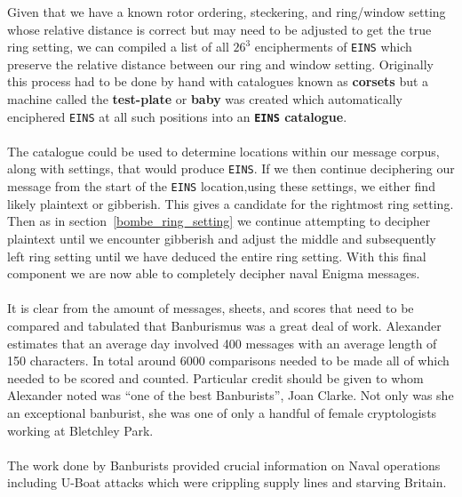   \noindent Given that we have a known rotor ordering, steckering,
  and ring/window setting whose relative distance is correct but may
  need to be adjusted to get the true ring setting, we can compiled a
  list of all $26^3$ encipherments of \texttt{EINS} which preserve
  the relative distance between our ring and window setting.
  Originally this process had to be done by hand with catalogues
  known as {\bf{corsets}} but a machine called the {\bf{test-plate}}
  or {\bf{baby}} was created which automatically enciphered
  \texttt{EINS} at all such positions into an {\bf{\texttt{EINS} catalogue}}.
  \\\\The catalogue could be used to determine locations within our
  message corpus, along with settings, that would produce
  \texttt{EINS}. If we then continue deciphering our message from the
  start of the \texttt{EINS} location,using these settings, we either
  find likely plaintext or gibberish. This gives a candidate for the
  rightmost ring setting. Then as in section~\ref{bombe_ring_setting}
  we continue attempting to decipher plaintext until we encounter
  gibberish and adjust the middle and subsequently left ring setting
  until we have deduced the entire ring setting. With this final
  component we are now able to completely decipher naval Enigma messages.
  \\\\It is clear from the amount of messages, sheets, and scores
  that need to be compared and tabulated that Banburismus was a great
  deal of work. Alexander estimates that an average day involved 400
  messages with an average length of 150 characters. In total around
  6000 comparisons needed to be made all of which needed to be scored
  and counted. Particular credit should be given to whom Alexander
  noted was ``one of the best Banburists'', Joan Clarke. Not only was
  she an exceptional banburist, she was one of only a handful of
  female cryptologists working at Bletchley Park.
  \\\\The work done by Banburists provided crucial information on
  Naval operations including U-Boat attacks which were crippling
  supply lines and starving Britain.

